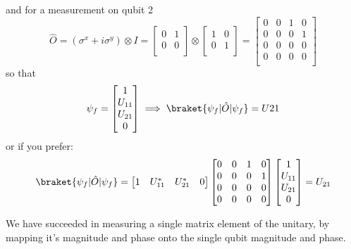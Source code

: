 and for a measurement on qubit 2
\begin{equation}
    \hat{O}=(\sigma^{x} + i\sigma^{y}) \otimes I=
    \begin{bmatrix}
        0 & 1\\
        0 & 0\\
    \end{bmatrix}
    \otimes
    \begin{bmatrix}
        1 & 0\\
        0 & 1\\
    \end{bmatrix}
    =
    \begin{bmatrix}
        0 & 0 & 1 & 0\\
        0 & 0 & 0 & 1\\
        0 & 0 & 0 & 0\\
        0 & 0 & 0 & 0\\
    \end{bmatrix}
\end{equation}
so that
\begin{equation}
    \psi_{f}=
    \begin{bmatrix}
        1 \\
        U_{11} \\
        U_{21} \\
        0 \\
    \end{bmatrix}
    \implies
    \braket{\psi_{f}|\hat{O}|\psi_{f}} = U21
\end{equation}
or if you prefer:
\begin{equation}
    \braket{\psi_{f}|\hat{O}|\psi_{f}} =
    \begin{bmatrix}
        1 & U_{11}^{*} & U_{21}^{*} & 0
    \end{bmatrix}
    \begin{bmatrix}
        0 & 0 & 1 & 0\\
        0 & 0 & 0 & 1\\
        0 & 0 & 0 & 0\\
        0 & 0 & 0 & 0\\
    \end{bmatrix}
    \begin{bmatrix}
        1 \\
        U_{11} \\
        U_{21} \\
        0 \\
    \end{bmatrix}
    = U_{21}
\end{equation}

We have succeeded in measuring a single matrix element of the unitary, by mapping it's magnitude and phase onto the single qubit magnitude and phase.

